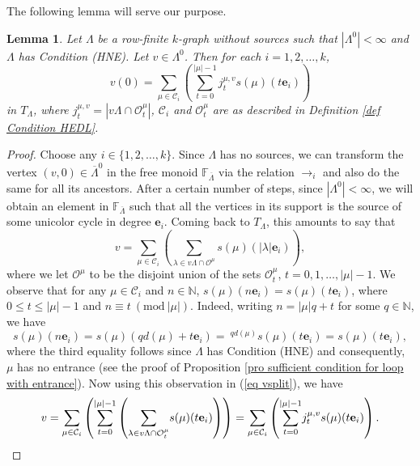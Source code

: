 \documentclass[a4paper,reqno,12pt]{amsart}
\numberwithin{equation}{section}
\newtheorem{lem}[thm]{Lemma}
\theoremstyle{definition}
\theoremstyle{remark}
\begin{document}
The following lemma will serve our purpose.
\begin{lem}\label{lem vertex representation as sum cycle elements}
Let $\Lambda$ be a row-finite $k$-graph without sources such that $|\Lambda^0|<\infty$ and $\Lambda$ has Condition \textup{(HNE)}. Let $v\in \Lambda^0$. Then for each $i=1,2,\ldots,k$, \[v(0)=\displaystyle{\sum_{\mu\in \mathcal{C}_i}}\left(\displaystyle{\sum_{t=0}^{|\mu|-1}}j_t^{\mu,v}s(\mu)(t\mathbf{e}_i)\right)\] in $T_\Lambda$, where $j_t^{\mu,v}=|v\Lambda \cap \mathcal{O}_t^\mu|$, $\mathcal{C}_i$ and $\mathcal{O}_t^\mu$ are as described in Definition \textup{\ref{def Condition HEDL}}.  
\end{lem}
\begin{proof}
Choose any $i\in \{1,2,\ldots,k\}$. Since $\Lambda$ has no sources, we can transform the vertex $(v,0)\in \overline{\Lambda}^0$ in the free monoid $\mathbb{F}_{\overline{\Lambda}}$ via the relation $\longrightarrow_i$ and also do the same for all its ancestors. After a certain number of steps, since $|\Lambda^0|<\infty$, we will obtain an element in $\mathbb{F}_{\overline{\Lambda}}$ such that all the vertices in its support is the source of some unicolor cycle in degree $\mathbf{e}_i$. Coming back to $T_\Lambda$, this amounts to say that 
\begin{equation}\label{eq vsplit}
v=\displaystyle{\sum_{\mu\in \mathcal{C}_i}}\left(\displaystyle{\sum_{\lambda\in v\Lambda\cap \mathcal{O}^\mu}}s(\mu)(|\lambda|\mathbf{e}_i)\right),
\end{equation}
where we let $\mathcal{O}^\mu$ to be the disjoint union of the sets $\mathcal{O}_t^\mu$, $t=0,1,\ldots,|\mu|-1$. We observe that for any $\mu\in \mathcal{C}_i$ and $n\in \mathbb{N}$, $s(\mu)(n\mathbf{e}_i)=s(\mu)(t\mathbf{e}_i)$, where $0\le t\le |\mu|-1$ and $n\equiv t~(\text{mod}~|\mu|)$. Indeed, writing $n=|\mu|q+t$ for some $q\in \mathbb{N}$, we have \[s(\mu)(n\mathbf{e}_i)=s(\mu)(qd(\mu)+t\mathbf{e}_i)=~^{qd(\mu)}s(\mu)(t\mathbf{e}_i)=s(\mu)(t\mathbf{e}_i),\] where the third equality follows since $\Lambda$ has Condition (HNE) and consequently, $\mu$ has no entrance (see the proof of Proposition \ref{pro sufficient condition for loop with entrance}). Now using this observation in (\ref{eq vsplit}), we have \[v=\displaystyle{\sum_{\mu\in \mathcal{C}_i}}\left(\displaystyle{\sum_{t=0}^{|\mu|-1}}\left(\displaystyle{\sum_{\lambda\in v\Lambda\cap \mathcal{O}_t^\mu}}s(\mu)(t\mathbf{e}_i)\right)\right)=\displaystyle{\sum_{\mu\in \mathcal{C}_i}}\left(\displaystyle{\sum_{t=0}^{|\mu|-1}}j_t^{\mu,v} s(\mu)(t\mathbf{e}_i)\right).\qedhere\]  
\end{proof}
\end{document}
